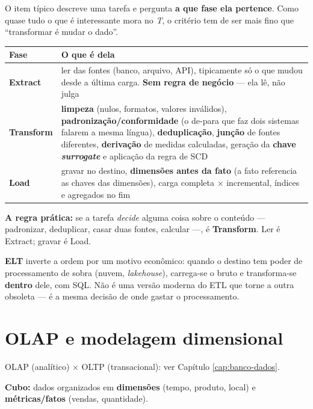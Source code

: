 \begin{conceito}
O item típico descreve uma tarefa e pergunta \textbf{a que fase ela pertence}.
Como quase tudo o que é interessante mora no \emph{T}, o critério tem de ser
mais fino que ``transformar é mudar o dado''.

\begin{center}
\begin{tabular}{@{}p{2.1cm}p{9.6cm}@{}}
\toprule
\textbf{Fase} & \textbf{O que é dela} \\
\midrule
\textbf{Extract} & ler das fontes (banco, arquivo, API), tipicamente só o que
mudou desde a última carga. \textbf{Sem regra de negócio} --- ela lê, não julga \\
\textbf{Transform} & \textbf{limpeza} (nulos, formatos, valores inválidos),
\textbf{padronização/conformidade} (o de-para que faz dois sistemas falarem a
mesma língua), \textbf{deduplicação}, \textbf{junção} de fontes diferentes,
\textbf{derivação} de medidas calculadas, geração da \textbf{chave
\emph{surrogate}} e aplicação da regra de SCD \\
\textbf{Load} & gravar no destino, \textbf{dimensões antes da fato} (a fato
referencia as chaves das dimensões), carga completa $\times$ incremental,
índices e agregados no fim \\
\bottomrule
\end{tabular}
\end{center}

\textbf{A regra prática:} se a tarefa \emph{decide} alguma coisa sobre o
conteúdo --- padronizar, deduplicar, casar duas fontes, calcular ---, é
\textbf{Transform}. Ler é Extract; gravar é Load.

\textbf{ELT} inverte a ordem por um motivo econômico: quando o destino tem
poder de processamento de sobra (nuvem, \emph{lakehouse}), carrega-se o bruto e
transforma-se \textbf{dentro} dele, com SQL. Não é uma versão moderna do ETL
que torne a outra obsoleta --- é a mesma decisão de onde gastar o
processamento.
\end{conceito}

\section{OLAP e modelagem dimensional}

OLAP (analítico) $\times$ OLTP (transacional): ver Capítulo
\ref{cap:banco-dados}.

\textbf{Cubo:} dados organizados em \textbf{dimensões} (tempo, produto,
local) e \textbf{métricas/fatos} (vendas, quantidade).

